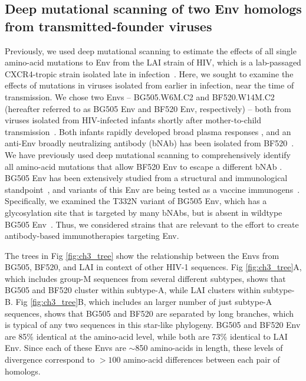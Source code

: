\documentclass[9pt]{elife}
\begin{document}
\subsection*{Deep mutational scanning of two Env homologs from transmitted-founder viruses}
Previously, we used deep mutational scanning to estimate the effects of all single amino-acid mutations to Env from the LAI strain of HIV, which is a lab-passaged CXCR4-tropic strain isolated late in infection~\cite{peden1991changes,haddox2016experimental}.
Here, we sought to examine the effects of mutations in viruses isolated from earlier in infection, near the time of transmission.
We chose two Envs -- BG505.W6M.C2 and BF520.W14M.C2 (hereafter referred to as BG505 Env and BF520 Env, respectively) -- both from viruses isolated from HIV-infected infants shortly after mother-to-child transmission~\cite{goo2014early}.
Both infants rapidly developed broad plasma responses \cite{goo2014early}, and an anti-Env broadly neutralizing antibody (bNAb) has been isolated from BF520~\cite{simonich2016hiv}.
We have previously used deep mutational scanning to comprehensively identify all amino-acid mutations that allow BF520 Env to escape a different bNAb \cite{dingens2017comprehensive}.
BG505 Env has been extensively studied from a structural and immunological standpoint~\cite{julien2013crystal,lyumkis2013cryo,pancera2014structure,huang2014broad,falkowska2014broadly,sanders2015hiv,stewart2016trimeric}, and variants of this Env are being tested as a vaccine immunogens~\cite{sanders2013next,sanders2015hiv,de2015immunogenicity}.
Specifically, we examined the T332N variant of BG505 Env, which has a glycosylation site that is targeted by many bNAbs, but is absent in wildtype BG505 Env~\cite{sanders2013next}.
Thus, we considered strains that are relevant to the effort to create antibody-based immunotherapies targeting Env.

The trees in Fig \ref{fig:ch3_tree} show the relationship between the Envs from BG505, BF520, and LAI in context of other HIV-1 sequences.
Fig \ref{fig:ch3_tree}A, which includes group-M sequences from several different subtypes, shows that BG505 and BF520 cluster within subtype-A, while LAI clusters within subtype-B.
Fig \ref{fig:ch3_tree}B, which includes an larger number of just subtype-A sequences, shows that BG505 and BF520 are separated by long branches, which is typical of any two sequences in this star-like phylogeny.
BG505 and BF520 Env are 85\% identical at the amino-acid level, while both are 73\% identical to LAI Env.
Since each of these Envs are $\sim$850 amino-acids in length, these levels of divergence correspond to $>100$ amino-acid differences between each pair of homologs.
\end{document}

